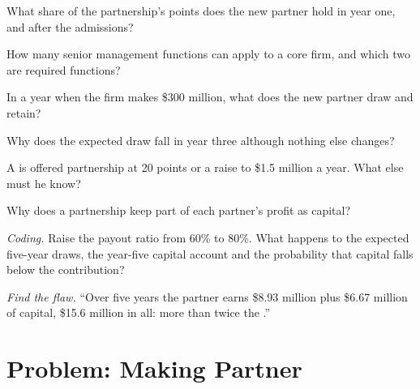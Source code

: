 \begin{exercise}[$\star$]\label{exo:in:leadership-roles:1}
What share of the partnership's points does the new partner hold in year one, and after the admissions?
\end{exercise}

\begin{exercise}[$\star$]\label{exo:in:leadership-roles:2}
How many senior management functions can apply to a core firm, and which two are required functions?
\end{exercise}

\begin{exercise}[$\star$]\label{exo:in:leadership-roles:3}
In a year when the firm makes \$300 million, what does the new partner draw and retain?
\end{exercise}

\begin{exercise}[$\star\star$]\label{exo:in:leadership-roles:4}
Why does the expected draw fall in year three although nothing else changes?
\end{exercise}

\begin{exercise}[$\star\star$]\label{exo:in:leadership-roles:5}
A  is offered partnership at 20 points or a raise to \$1.5 million a year. What else must he know?
\end{exercise}

\begin{exercise}[$\star\star$]\label{exo:in:leadership-roles:6}
Why does a partnership keep part of each partner's profit as capital?
\end{exercise}

\begin{exercise}[$\star\star\star$]\label{exo:in:leadership-roles:7}
\emph{Coding.} Raise the payout ratio from 60\% to 80\%. What happens to the expected five-year draws, the year-five
capital account and the probability that capital falls below the contribution?
\end{exercise}

\begin{exercise}[$\star\star\star$]\label{exo:in:leadership-roles:8}
\emph{Find the flaw.} ``Over five years the partner earns \$8.93 million plus \$6.67 million of capital, \$15.6 million
in all: more than twice the .''
\end{exercise}

\section{Problem: Making Partner}

